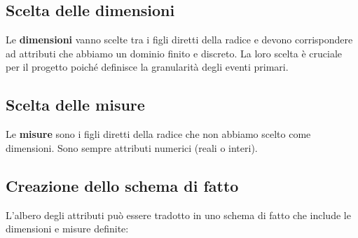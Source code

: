  \subsection{Scelta delle dimensioni}
 Le \textbf{dimensioni} vanno scelte tra i figli diretti della radice e devono corrispondere ad attributi che abbiamo un dominio finito e discreto. La loro scelta è cruciale per il progetto poiché definisce la granularità degli eventi primari. 
\subsection{Scelta delle misure}
Le \textbf{misure} sono i figli diretti della radice che non abbiamo scelto come dimensioni. Sono sempre attributi numerici (reali o interi). 
\subsection{Creazione dello schema di fatto} 
L’albero degli attributi può essere tradotto in uno schema di fatto che include le dimensioni e misure definite:
